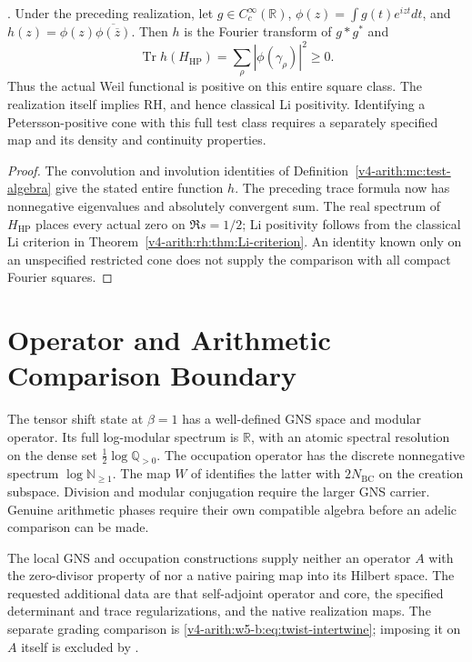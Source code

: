 \begin{corollary}
\label{v4-arith:w5-b:cor:weil-positive}
\ClaimStatusProvedHereConditional. Under the preceding realization,
let $g\in C_c^\infty(\mathbb R)$,
$\phi(z)=\int g(t)e^{izt}dt$, and
$h(z)=\phi(z)\overline{\phi(\overline z)}$.
Then $h$ is the Fourier transform of $g*g^*$ and
\[
 \operatorname{Tr}h(H_{\mathrm{HP}})
                 =\sum_\rho|\phi(\gamma_\rho)|^2\geq0.
\]
Thus the actual Weil functional is positive on this entire square
class. The realization itself implies RH, and hence classical Li
positivity. Identifying a Petersson-positive cone with this full
test class requires a separately specified map and its density and
continuity properties.
\end{corollary}
\begin{proof}
The convolution and involution identities of
Definition~\ref{v4-arith:mc:test-algebra} give the stated entire
function $h$. The preceding trace formula now has nonnegative
eigenvalues and absolutely convergent sum. The real spectrum of
$H_{\mathrm{HP}}$ places every actual zero on $\Re s=1/2$;
Li positivity follows from the classical Li criterion
in Theorem~\ref{v4-arith:rh:thm:Li-criterion}.
An identity known only on an unspecified restricted cone does not
supply the comparison with all compact Fourier squares.
\end{proof}

\section{Operator and Arithmetic Comparison Boundary}
\label{v4-arith:w5-b:form}
\label{v4-arith:w5-b:form:layer-1}
\label{v4-arith:w5-b:form:layer-2}
\label{v4-arith:w5-b:form:layer-3}
\label{v4-arith:w5-b:form:summary}

The tensor shift state at $\beta=1$ has a well-defined GNS
space and modular operator. Its full log-modular spectrum is
$\mathbb R$, with an atomic spectral resolution on the dense
set $\tfrac12\log\mathbb Q_{>0}$. The occupation operator has
the discrete nonnegative spectrum $\log\mathbb N_{\geq1}$.
The map $W$ of 
identifies the latter with $2N_{\mathrm{BC}}$ on the creation
subspace. Division and modular conjugation require the larger
GNS carrier. Genuine arithmetic phases require their own
compatible algebra before an adelic comparison can be made.

\begin{proposition}
\label{v4-arith:w5-b:thm:precise-obstruction}
The local GNS and occupation constructions supply neither an
operator $A$ with the zero-divisor property of
 nor a native pairing
map into its Hilbert space. The requested additional data are
that self-adjoint operator and core, the specified determinant
and trace regularizations, and the native realization maps.
The separate grading comparison is
\eqref{v4-arith:w5-b:eq:twist-intertwine}; imposing it on $A$
itself is excluded by .
\end{proposition}

